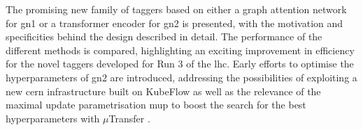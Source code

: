 The promising new family of taggers based on either a graph attention network for \gls{gn1} or a transformer encoder for \gls{gn2} is presented, with the motivation and specificities behind the design described in detail. The performance of the different methods is compared, highlighting an exciting improvement in efficiency for the novel taggers developed for Run 3 of the \gls{lhc}. Early efforts to optimise the hyperparameters of \gls{gn2} are introduced, addressing the possibilities of exploiting a new \gls{cern} infrastructure built on KubeFlow as well as the relevance of the maximal update parametrisation \gls{mup} to boost the search for the best hyperparameters with $\mu$Transfer \cite{yang2021tuning}. 


